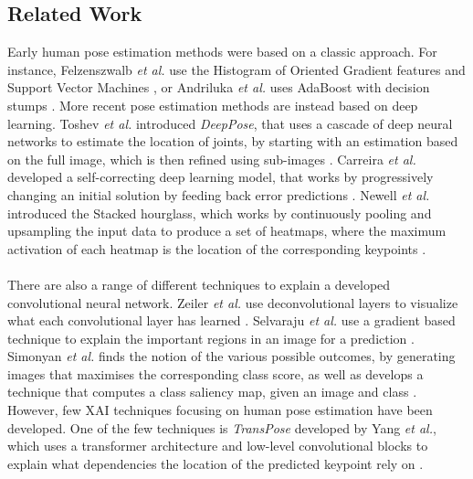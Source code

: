 \documentclass[./main.tex]{subfiles}
\begin{document}
\subsection{Related Work}
Early human pose estimation methods were based on a classic approach. For instance, Felzenszwalb \textit{et al.} use the Histogram of Oriented Gradient features and Support Vector Machines \cite{Felzenszwalb}, or Andriluka \textit{et al.} uses AdaBoost with decision stumps \cite{Andriluka}. More recent pose estimation methods are instead based on deep learning. Toshev \textit{et al.} introduced \textit{DeepPose}, that uses a cascade of deep neural networks to estimate the location of joints, by starting with an estimation based on the full image, which is then refined using sub-images \cite{DeepPose}. Carreira \textit{et al.} developed a self-correcting deep learning model, that works by progressively changing an initial solution by feeding back error predictions \cite{Carreira}. Newell \textit{et al.} introduced the Stacked hourglass, which works by continuously pooling and upsampling the input data to produce a set of heatmaps, where the maximum activation of each heatmap is the location of the corresponding keypoints \cite{Newell}.
\\
\\
There are also a range of different techniques to explain a developed convolutional neural network. Zeiler \textit{et al.} use deconvolutional layers to visualize what each convolutional layer has learned \cite{Zeiler}. Selvaraju \textit{et al.} use a gradient based technique to explain the important regions in an image for a prediction \cite{Selvaraju}. Simonyan \textit{et al.} finds the notion of the various possible outcomes, by generating images that maximises the corresponding class score, as well as develops a technique that computes a class saliency map, given an image and class \cite{Simonyan}. However, few XAI techniques focusing on human pose estimation have been developed. One of the few techniques is \textit{TransPose} developed by Yang \textit{et al.}, which uses a transformer architecture and low-level convolutional blocks to explain what dependencies the location of the predicted keypoint rely on \cite{TransPose}.
\\
\\
\end{document}
